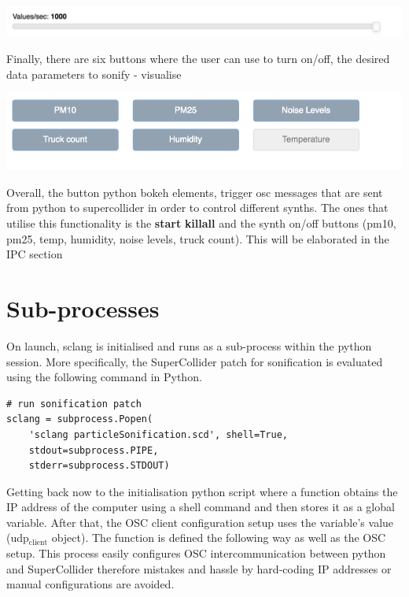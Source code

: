 \documentclass[11pt]{article}
\begin{document}
\begin{center}
\includegraphics[width=.9\linewidth]{./values_sec.png}
\end{center}

Finally, there are six buttons where the user can use to turn on/off, the desired data parameters to sonify - visualise

\begin{center}
\includegraphics[width=.9\linewidth]{./synth_onoff.png}
\end{center}

\vspace{0.5em}

Overall, the button python bokeh elements, trigger osc messages that are sent from python to supercollider in order to control different synths.
The ones that utilise this functionality is the \textbf{start} \textbf{killall} and the synth on/off buttons (pm10, pm25, temp, humidity, noise levels, truck count).
This will be elaborated in the IPC section

\section{Sub-processes}
\label{sec:org9c14d07}
On launch, sclang is initialised and runs as a sub-process within the python session.  More specifically, the SuperCollider  patch for sonification is evaluated using the following command in Python.
\begin{verbatim}
# run sonification patch
sclang = subprocess.Popen(
    'sclang particleSonification.scd', shell=True,
    stdout=subprocess.PIPE,
    stderr=subprocess.STDOUT)
\end{verbatim}
Getting back now to the initialisation python script where a function obtains the IP address of the computer using a shell command and then stores it as a global variable.  After that, the OSC client configuration setup uses the variable's value (udp\(_{\text{client}}\) object).  The function is defined the following way as well as the OSC setup.  This process easily configures OSC intercommunication between python and SuperCollider therefore mistakes and hassle by hard-coding IP addresses or manual configurations are avoided.
\end{document}
